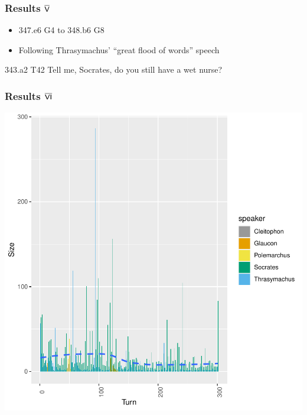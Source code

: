 \documentclass{beamer}
\renewcommand{\Roman}[1]{$\overline{\textsf{\small{\MakeUppercase{\romannumeral #1}}}}$}
\begin{document}
\begin{frame}
\frametitle{Results \Roman{5}}
\begin{itemize}
\item 347.e6 G4 to 348.b6 G8
\item Following Thrasymachus' ``great flood of words'' speech
\end{itemize}

\begin{block}{343.a2 T42}
Tell me, Socrates, do you still have a wet nurse?
\end{block}
\end{frame}

\begin{frame}[fragile]
\frametitle{Results \Roman{6}}
\includegraphics{GreatSlideshow-022}
\end{frame}
\end{document}
